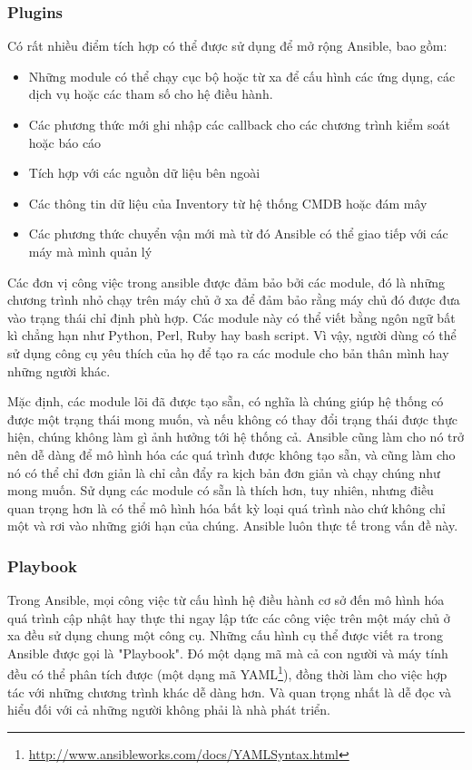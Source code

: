 \subsubsection{Plugins}

Có rất nhiều điểm tích hợp có thể được sử dụng để mở rộng Ansible, bao gồm:

\begin{itemize}
\item Những module có thể chạy cục bộ hoặc từ xa để cấu hình các ứng dụng, các dịch vụ hoặc các tham số cho hệ điều hành.
\item Các phương thức mới ghi nhập các callback cho các chương trình kiểm soát hoặc báo cáo
\item Tích hợp với các nguồn dữ liệu bên ngoài
\item Các thông tin dữ liệu của Inventory từ hệ thống CMDB hoặc đám mây
\item Các phương thức chuyển vận mới mà từ đó Ansible có thể giao tiếp với các máy mà mình quản lý
\end{itemize}

Các đơn vị công việc trong ansible được đảm bảo bởi các module, đó là những chương trình nhỏ chạy trên máy chủ ở xa để đảm bảo rằng máy chủ đó được đưa vào trạng thái chỉ định phù hợp. Các module này có thể viết bằng ngôn ngữ bất kì chẳng hạn như Python, Perl, Ruby hay bash script. Vì vậy, người dùng có thể sử dụng công cụ yêu thích của họ để tạo ra các module cho bản thân mình hay những người khác.

Mặc định, các module lõi đã được tạo sẵn, có nghĩa là chúng giúp hệ thống có được một trạng thái mong muốn, và nếu không có thay đổi trạng thái được thực hiện, chúng không làm gì ảnh hưởng tới hệ thống cả. Ansible cũng làm cho nó trở nên dễ dàng để mô hình hóa các quá trình được không tạo sẵn, và cũng làm cho nó có thể chỉ đơn giản là chỉ cần đẩy ra kịch bản đơn giản và chạy chúng như mong muốn. Sử dụng các module có sẵn là thích hơn, tuy nhiên, nhưng điều quan trọng hơn là có thể mô hình hóa bất kỳ loại quá trình nào chứ không chỉ một và rơi vào những giới hạn của chúng. Ansible luôn thực tế trong vấn đề này.


\subsubsection{Playbook}


Trong Ansible, mọi công việc từ cấu hình hệ điều hành cơ sở đến mô hình hóa quá trình cập nhật hay thực thi ngay lập tức các công việc trên một máy chủ ở xa đều sử dụng chung một công cụ. Những cấu hình cụ thể được viết ra trong Ansible được gọi là "Playbook". Đó một dạng mã mà cả con người và máy tính đều có thể phân tích được (một dạng mã YAML\footnote{\url{http://www.ansibleworks.com/docs/YAMLSyntax.html}}), đồng thời làm cho việc hợp tác với những chương trình khác dễ dàng hơn. Và quan trọng nhất là dễ đọc và hiểu đối với cả những người không phải là nhà phát triển.

